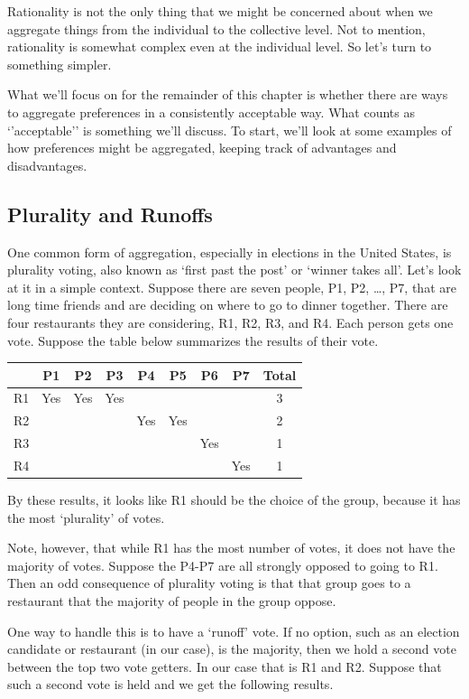 \documentclass[]{tufte-book}
\begin{document}
Rationality is not the only thing that we might be concerned about when we aggregate things from the individual to the collective level. Not to mention, rationality is somewhat complex even at the individual level. So let's turn to something simpler.

What we'll focus on for the remainder of this chapter is whether there are ways to aggregate preferences in a consistently acceptable way. What counts as `'acceptable'' is something we'll discuss. To start, we'll look at some examples of how preferences might be aggregated, keeping track of advantages and disadvantages.

\hypertarget{plurality-and-runoffs}{%
\subsection{Plurality and Runoffs}\label{plurality-and-runoffs}}

One common form of aggregation, especially in elections in the United States, is plurality voting, also known as `first past the post' or `winner takes all'. Let's look at it in a simple context. Suppose there are seven people, P1, P2, \ldots{}, P7, that are long time friends and are deciding on where to go to dinner together. There are four restaurants they are considering, R1, R2, R3, and R4. Each person gets one vote. Suppose the table below summarizes the results of their vote.

\begin{longtable}[]{@{}lcccccccc@{}}
\toprule
& P1 & P2 & P3 & P4 & P5 & P6 & P7 & Total\tabularnewline
\midrule
\endhead
R1 & Yes & Yes & Yes & & & & & 3\tabularnewline
R2 & & & & Yes & Yes & & & 2\tabularnewline
R3 & & & & & & Yes & & 1\tabularnewline
R4 & & & & & & & Yes & 1\tabularnewline
\bottomrule
\end{longtable}

By these results, it looks like R1 should be the choice of the group, because it has the most `plurality' of votes.

Note, however, that while R1 has the most number of votes, it does not have the majority of votes. Suppose the P4-P7 are all strongly opposed to going to R1. Then an odd consequence of plurality voting is that that group goes to a restaurant that the majority of people in the group oppose.

One way to handle this is to have a `runoff' vote. If no option, such as an election candidate or restaurant (in our case), is the majority, then we hold a second vote between the top two vote getters. In our case that is R1 and R2. Suppose that such a second vote is held and we get the following results.
\end{document}
